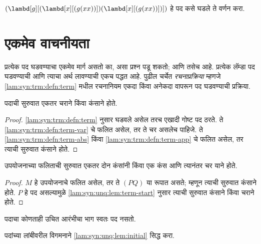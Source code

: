 \begin{prob}
$(\lambd[g][(\lambd[x][(g (x x))])
  (\lambd[x][(g (x x))])])$ हे पद कसे घडले ते वर्णन करा.
\end{prob}











\section{एकमेव वाचनीयता}\label{lam:syn:unq:sec}

प्रत्येक पद घडवण्याचा एकमेव मार्ग असतो का, असा प्रश्न
पडू शकतो; आणि तसेच आहे. प्रत्येक लॅम्डा पद घडवण्याची
आणि त्याचा अर्थ लावण्याची एकच पद्धत आहे. पुढील चर्चेत
\emph{रचनाप्रक्रिया} म्हणजे \ref{lam:syn:trm:defn:term}
मधील रचनानियम एकदा किंवा अनेकदा वापरून पद घडवण्याची
प्रक्रिया.

\begin{lem}\label{lam:syn:unq:lem:term-start}
पदाची सुरुवात एकतर चराने किंवा कंसाने होते.
\end{lem}

\begin{proof}
\ref{lam:syn:trm:defn:term} नुसार घडवले असेल तरच एखादी
गोष्ट पद ठरते. ते \ref{lam:syn:trm:defn:term-var} चे फलित
असेल, तर ते चर असलेच पाहिजे. ते
\ref{lam:syn:trm:defn:term-abs} किंवा
\ref{lam:syn:trm:defn:term-app} चे फलित असेल, तर
त्याची सुरुवात कंसाने होते.
\end{proof}

\begin{lem}\label{lam:syn:unq:lem:app-start}
उपयोजनाच्या फलिताची सुरुवात एकतर दोन कंसांनी किंवा
एक कंस आणि त्यानंतर चर याने होते.
\end{lem}

\begin{proof}
$M$ हे उपयोजनाचे फलित असेल, तर ते $(PQ)$ या रूपात
असते; म्हणून त्याची सुरुवात कंसाने होते. $P$ हे पद
असल्यामुळे \ref{lam:syn:unq:lem:term-start} नुसार त्याची
सुरुवात कंसाने किंवा चराने होते.
\end{proof}

\begin{lem}\label{lam:syn:unq:lem:initial}
पदाचा कोणताही उचित आरंभीचा भाग स्वतः पद नसतो.
\end{lem}

\begin{prob}
पदांच्या लांबीवरील विगमनाने
\ref{lam:syn:unq:lem:initial} सिद्ध करा.
\end{prob}

